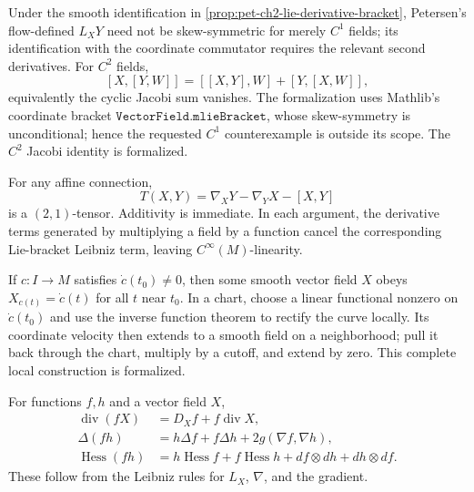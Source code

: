 \begin{remark}
  \label{rem:pet-ch2-ex-2}
  \leanok
  Under the smooth identification in
  \cref{prop:pet-ch2-lie-derivative-bracket}, Petersen's flow-defined $L_XY$ need not be
  skew-symmetric for merely $C^1$ fields; its identification with the coordinate
  commutator requires the relevant second derivatives. For $C^2$ fields,
  \[
    [X,[Y,W]]=[[X,Y],W]+[Y,[X,W]],
  \]
  equivalently the cyclic Jacobi sum vanishes.
  The formalization uses Mathlib's coordinate bracket
  $\texttt{VectorField.mlieBracket}$, whose skew-symmetry is unconditional;
  hence the requested $C^1$ counterexample is outside its scope. The $C^2$
  Jacobi identity is formalized.
\end{remark}

\begin{remark}
  \label{rem:pet-ch2-ex-3}
  \leanok
  For any affine connection,
  \[
    T(X,Y)=\nabla_XY-\nabla_YX-[X,Y]
  \]
  is a $(2,1)$-tensor.
  \sketch
  Additivity is immediate. In each argument, the derivative terms generated
  by multiplying a field by a function cancel the corresponding Lie-bracket
  Leibniz term, leaving $C^\infty(M)$-linearity.
\end{remark}

\begin{remark}
  \label{rem:pet-ch2-ex-4}
  \leanok
  If $c:I\to M$ satisfies
  $\dot c(t_0)\ne0$, then some smooth vector field $X$ obeys
  $X_{c(t)}=\dot c(t)$ for all $t$ near $t_0$.
  \sketch
  In a chart, choose a linear functional nonzero on $\dot c(t_0)$ and use the
  inverse function theorem to rectify the curve locally. Its coordinate
  velocity then extends to a smooth field on a neighborhood; pull it back
  through the chart, multiply by a cutoff, and extend by zero. This complete
  local construction is formalized.
\end{remark}

\begin{remark}
  \label{rem:pet-ch2-ex-5}
  \leanok
  For functions $f,h$ and a vector field $X$,
  \[
  \begin{aligned}
    \operatorname{div}(fX)
      &=D_Xf+f\operatorname{div}X,\\
    \Delta(fh)
      &=h\Delta f+f\Delta h+2g(\nabla f,\nabla h),\\
    \operatorname{Hess}(fh)
      &=h\operatorname{Hess}f+f\operatorname{Hess}h
        +df\otimes dh+dh\otimes df.
  \end{aligned}
  \]
  \sketch
  These follow from the Leibniz rules for $L_X$, $\nabla$, and the gradient.
\end{remark}

